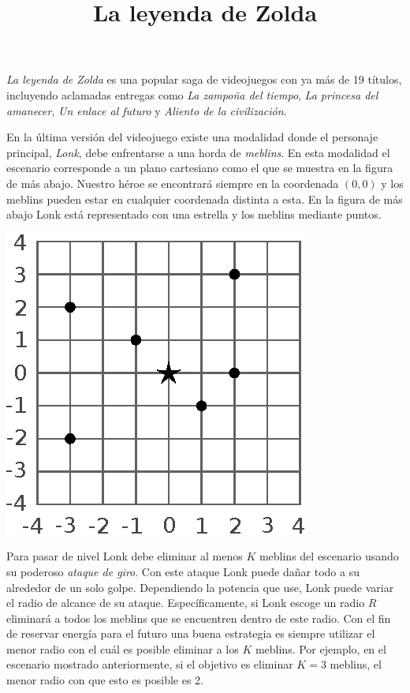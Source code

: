 \documentclass{oci}
\title{La leyenda de Zolda}
\begin{document}
\begin{problemDescription}
  \emph{La leyenda de Zolda} es una popular saga de videojuegos con ya más de 19
  títulos, incluyendo aclamadas entregas como \emph{La zampoña del tiempo},
  \emph{La princesa del amanecer}, \emph{Un enlace al futuro} y \emph{Aliento de
  la civilización}.

  En la última versión del videojuego existe una modalidad donde el personaje
  principal, \emph{Lonk}, debe enfrentarse a una horda de \emph{meblins}.
  En esta modalidad el escenario corresponde a un plano cartesiano como el que
  se muestra en la figura de más abajo.
  Nuestro héroe se encontrará siempre en la coordenada $(0,0)$ y los meblins
  pueden estar en cualquier coordenada distinta a esta.
  En la figura de más abajo Lonk está representado con una estrella y los meblins
  mediante puntos.
  \vspace{-0.5em}
  \begin{center}
  \includegraphics[scale=0.9]{zolda}
  \end{center}
  \vspace{-0.5em}
  Para pasar de nivel Lonk debe eliminar al menos $K$ meblins del escenario
  usando su poderoso \emph{ataque de giro}.
  Con este ataque Lonk puede dañar todo a su alrededor de un solo golpe.
  Dependiendo la potencia que use, Lonk puede variar el radio de alcance de su
  ataque.
  Específicamente, si Lonk escoge un radio $R$ eliminará a todos los meblins que
  se encuentren dentro de este radio.
  Con el fin de reservar energía para el futuro una buena estrategia es siempre
  utilizar el menor radio con el cuál es posible eliminar a los $K$ meblins.
  Por ejemplo, en el escenario mostrado anteriormente, si el objetivo es eliminar
  $K=3$ meblins, el menor radio con que esto es posible es 2.


\end{problemDescription}
\end{document}

